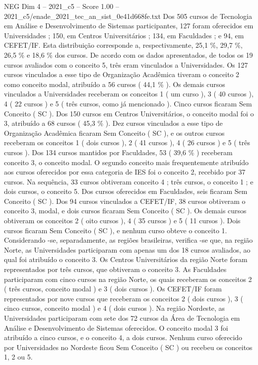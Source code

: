\begin{textsample}{NEG Dim 4 – 2021\_c5 – Score 1.00 – 2021\_c5/enade\_2021\_tec\_an\_sist\_0e41d668fe.txt}
Dos 505 cursos de Tecnologia em Análise e Desenvolvimento de Sistemas participantes, 127 foram oferecidos em Universidades ; 150, em Centros Universitários ; 134, em Faculdades ; e 94, em CEFET/IF.
Esta distribuição corresponde a, respectivamente, 25,1 \%, 29,7 \%, 26,5 \% e 18,6 \% dos cursos.
De acordo com os dados apresentados, de todos os 19 cursos avaliados com o conceito 5, três eram vinculados a Universidades.
Os 127 cursos vinculados a esse tipo de Organização Acadêmica tiveram o conceito 2 como conceito modal, atribuído a 56 cursos ( 44,1 \% ).
Os demais cursos vinculados a Universidades receberam os conceitos 1 ( um curso ), 3 ( 40 cursos ), 4 ( 22 cursos ) e 5 ( três cursos, como já mencionado ).
Cinco cursos ficaram Sem Conceito ( SC ).
Dos 150 cursos em Centros Universitários, o conceito modal foi o 3, atribuído a 68 cursos ( 45,3 \% ).
Dez cursos vinculados a esse tipo de Organização Acadêmica ficaram Sem Conceito ( SC ), e os outros cursos receberam os conceitos 1 ( dois cursos ), 2 ( 41 cursos ), 4 ( 26 cursos ) e 5 ( três cursos ).
Dos 134 cursos mantidos por Faculdades, 53 ( 39,6 \% ) receberam conceito 3, o conceito modal.
O segundo conceito mais frequentemente atribuído aos cursos oferecidos por essa categoria de IES foi o conceito 2, recebido por 37 cursos.
Na sequência, 33 cursos obtiveram conceito 4 ; três cursos, o conceito 1 ; e dois cursos, o conceito 5.
Dos cursos oferecidos em Faculdades, seis ficaram Sem Conceito ( SC ).
Dos 94 cursos vinculados a CEFET/IF, 38 cursos obtiveram o conceito 3, modal, e dois cursos ficaram Sem Conceito ( SC ).
Os demais cursos obtiveram os conceitos 2 ( oito cursos ), 4 ( 35 cursos ) e 5 ( 11 cursos ).
Dois cursos ficaram Sem Conceito ( SC ), e nenhum curso obteve o conceito 1.
Considerando -se, separadamente, as regiões brasileiras, verifica -se que, na região Norte, as Universidades participaram com apenas um dos 18 cursos avaliados, ao qual foi atribuído o conceito 3.
Os Centros Universitários da região Norte foram representados por três cursos, que obtiveram o conceito 3.
As Faculdades participaram com cinco cursos na região Norte, os quais receberam os conceitos 2 ( três cursos, conceito modal ) e 3 ( dois cursos ).
Os CEFET/IF foram representados por nove cursos que receberam os conceitos 2 ( dois cursos ), 3 ( cinco cursos, conceito modal ) e 4 ( dois cursos ).
Na região Nordeste, as Universidades participaram com sete dos 72 cursos da Área de Tecnologia em Análise e Desenvolvimento de Sistemas oferecidos.
O conceito modal 3 foi atribuído a cinco cursos, e o conceito 4, a dois cursos.
Nenhum curso oferecido por Universidades no Nordeste ficou Sem Conceito ( SC ) ou recebeu os conceitos 1, 2 ou 5.

\end{textsample}
